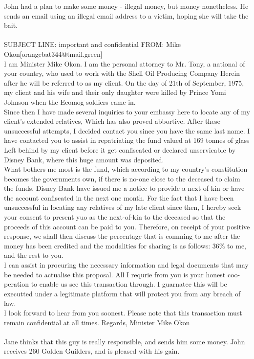 \documentclass{article}
\begin{document}
John had a plan to make some money {-} illegal money, but money nonetheless.
He sends an email using an illegal email address to a victim, hoping she will take the bait.
\\\\
SUBJECT LINE: important and confidential
FROM: Mike Okon[orangebat344@tmail.green]
\\
I am Minister Mike Okon.
I am the personal attorney to Mr. Tony, a national of your country, who used to work with the Shell Oil Producing Company
Herein after he will be referred to as my client.
On the day of 21th of September, 1975, my client and his wife and their only daughter were killed by Prince Yomi Johnson when the Ecomog soldiers came in.
\\
Since then I have made several inquiries to your embassy here to locate any of my client's extended relatives, Which has also proved abbortive.
After these unsuccessful attempts, I decided contact you since you have the same last name.
I have contacted you to assist in repatriating the fund valued at 169 tonnes of glass Left behind by my client before it get confiscated or declared unservicable by Disney Bank, where this huge amount was deposited.
\\
What bothers me most is the fund, which according to my country's constitution becomes the governments own, if there is no{-}one close to the deceased to claim the funds.
Disney Bank have issued me a notice to provide a next of kin or have the account confiscated in the next one month.
For the fact that I have been unsuccessful in locating any relatives of my late client since then, I hereby seek your consent to present yuo as the next{-}of{-}kin to the deceased so that the proceeds of this account can be paid to you.
Therefore, on receipt of your positive response, we shall then discuss the percentage that is comming to me after the money has been credited and the modalities for sharing is as follows: 36\% to me, and the rest to you.
\\
I can assist in procuring the necessary information and legal documents that may be needed to actualise this proposal.
All I requrie from you is your honest coo{-}peration to enable us see this transaction through.
I guarnatee this will be executted under a legitimate platform that will protect you from any breach of law.
\\
I look forward to hear from you soonest.
Please note that this transaction must remain confidential at all times.
Regards, Minister Mike Okon
\\\\
Jane thinks that this guy is really responsible, and sends him some money.
John receives 260 Golden Guilders, and is pleased with his gain.
\end{document}
